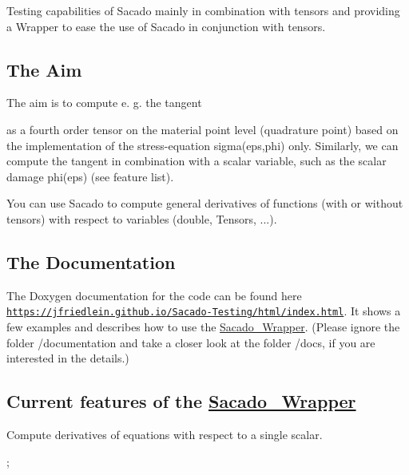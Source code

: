 Testing capabilities of Sacado mainly in combination with tensors and providing a Wrapper to ease the use of Sacado in conjunction with tensors.

\subsection*{The Aim}

The aim is to compute e. g. the tangent

\href{https://www.codecogs.com/eqnedit.php?latex=\overset{4}{C}&space;=&space;\frac{\partial\boldsymbol{\sigma}}{\partial\boldsymbol{\varepsilon&space;}}}{\tt }

as a fourth order tensor on the material point level (quadrature point) based on the implementation of the stress-\/equation sigma(eps,phi) only. Similarly, we can compute the tangent in combination with a scalar variable, such as the scalar damage phi(eps) (see feature list).

You can use Sacado to compute general derivatives of functions (with or without tensors) with respect to variables (double, Tensors, ...).

\subsection*{The Documentation}

The Doxygen documentation for the code can be found here \href{https://jfriedlein.github.io/Sacado-Testing/html/index.html}{\tt https\+://jfriedlein.\+github.\+io/\+Sacado-\/\+Testing/html/index.\+html}. It shows a few examples and describes how to use the \hyperlink{namespaceSacado__Wrapper}{Sacado\+\_\+\+Wrapper}. (Please ignore the folder /documentation and take a closer look at the folder /docs, if you are interested in the details.)

\subsection*{Current features of the \hyperlink{namespaceSacado__Wrapper}{Sacado\+\_\+\+Wrapper}}


\begin{DoxyItemize}
\item Compute derivatives of equations with respect to a single scalar.
\end{DoxyItemize}

\href{https://www.codecogs.com/eqnedit.php?latex={D}&space;=&space;\frac{\partial{\alpha}}{\partial{\phi&space;}}}{\tt } ; \href{https://www.codecogs.com/eqnedit.php?latex=\boldsymbol{A}&space;=&space;\frac{\partial\boldsymbol{\sigma}}{\partial{\phi&space;}}}{\tt }



